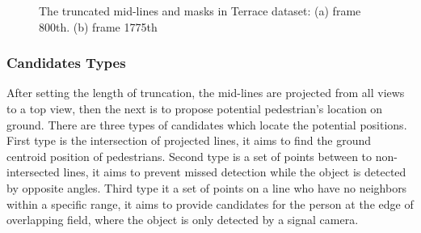 \documentclass[journal]{IEEEtran}
\begin{document}
\begin{figure} 
    \centering
    \hfill
  \caption{The truncated mid-lines and masks in Terrace dataset: (a) frame 800th. (b) frame 1775th}
  \label{fig1} 
\end{figure}



\subsubsection{Candidates Types}
After setting the length of truncation, the mid-lines are projected from all views to a top view, then the next is to propose potential pedestrian's location on ground.
There are three types of candidates which locate the potential positions. First type is the intersection of projected lines, it aims to find the ground centroid  position of pedestrians.
Second type is a set of points between to non-intersected lines, it aims to prevent missed detection while the object is detected by opposite angles.
Third type it a set of points on a line who have no neighbors within a specific range, it aims to provide candidates for the person at the edge of overlapping field, where the object is only detected by a signal camera.
\end{document}
